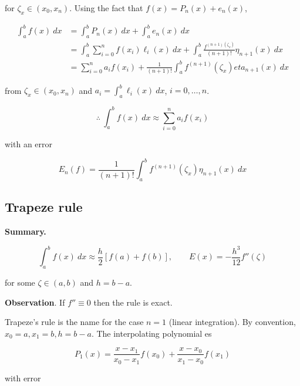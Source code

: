\documentclass[12pt]{article}
\theoremstyle{definition}
\begin{document}
for $\zeta_x \in (x_0, x_n)$. Using the fact that $f(x) = P_n(x) + e_n(x)$,

\begin{align*}
    \int_a^b f(x) ~ dx 
    &= \int_a^b P_n(x) ~ dx + \int_a^b e_n(x) ~ dx \\ 
    &= \int_a^b \sum_{i=0}^n f(x_i) \ell_i(x) ~ dx + \int_a^b
    \frac{f^{(n+1)(\zeta_x)}}{(n+1)!} \eta_{n+1}(x) ~ dx \\ 
    &= \sum_{i=0}^n a_i f(x_i) + \frac{1}{(n+1)!}\int_a^b f^{(n+1)}(\zeta_x)
    eta_{n+1}(x) ~ dx
\end{align*}

from $\zeta_x \in (x_0, x_n)$ and $a_i = \int_a^b \ell_i(x) ~ dx$, $i = 0,
\ldots, n$.

\begin{equation}
    \therefore ~ \int_a^b f(x) ~ dx \approx \sum_{i=0}^n a_i f(x_i)
\end{equation}

with an error 

\begin{equation}
    E_n(f) = \frac{1}{(n+1)!}\int_a^b f^{(n+1)}(\zeta_x) \eta_{n+1}(x) ~ dx
\end{equation}

\subsection{Trapeze rule}

\begin{shaded}
    \textbf{Summary.} 

    \begin{equation*}
        \int_a^b f(x) ~ dx \approx \frac{h}{2}\left[ f(a) + f(b) \right], \qquad
        E(x) = -\frac{h^3}{12} f''(\zeta)
    \end{equation*}

    for some $\zeta \in (a, b)$ and $h = b-a$.

    \textbf{Observation}. If $f'' \equiv 0$ then the rule is exact.
\end{shaded}

Trapeze's rule is the name for the case $n = 1$ (linear integration). By
convention, $x_0 = a, x_1 = b, h = b- a$. The interpolating polynomial es 

\begin{equation*}
    P_1(x) = \frac{x-x_1}{x_0 - x_1} f(x_0) + \frac{x-x_0}{x_1 - x_0} f(x_1)
\end{equation*}

with error 
\end{document}
